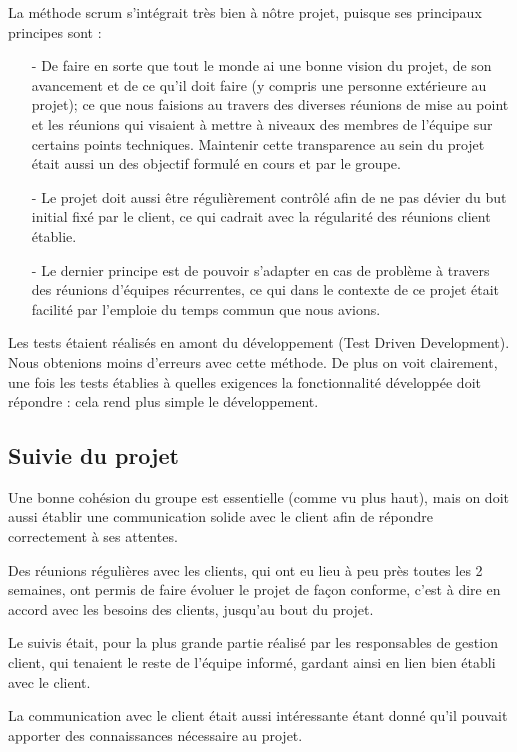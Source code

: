 La méthode scrum s'intégrait très bien à nôtre projet, puisque ses principaux principes sont :
\begin{itemize}
\item[-] De faire en sorte que tout le monde ai une bonne vision du projet, de son avancement et de ce qu'il doit faire (y compris une personne extérieure au projet); ce que nous faisions au travers des diverses réunions de mise au point et les réunions qui visaient à mettre à niveaux des membres de l'équipe sur certains points techniques.
Maintenir cette transparence au sein du projet était aussi un des objectif formulé en cours et par le groupe.
\item[-] Le projet doit aussi être régulièrement contrôlé afin de ne pas dévier du but initial fixé par le client, ce qui cadrait avec la régularité des réunions client établie.
\item[-] Le dernier principe est de pouvoir s'adapter en cas de problème à travers des réunions d'équipes récurrentes, ce qui dans le contexte de ce projet était facilité par l'emploie du temps commun que nous avions.
\end{itemize}



Les tests étaient réalisés en amont du développement (Test Driven Development). Nous obtenions moins d'erreurs avec cette méthode.
De plus on voit clairement, une fois les tests établies à quelles exigences la fonctionnalité développée doit répondre : cela rend plus simple le développement.

\subsection{Suivie du projet}

Une bonne cohésion du groupe est essentielle (comme vu plus haut), mais on doit aussi établir une communication solide avec le client afin de répondre correctement à ses attentes.

Des réunions régulières avec les clients, qui ont eu lieu à peu près toutes les 2 semaines, ont permis de faire évoluer le projet de façon conforme, c'est à dire en accord avec les besoins des clients, jusqu'au bout du projet.

Le suivis était, pour la plus grande partie réalisé par les responsables de gestion client, qui tenaient le reste de l'équipe informé, gardant ainsi en lien bien établi avec le client.

La communication avec le client était aussi intéressante étant donné qu'il pouvait apporter des connaissances nécessaire au projet.

